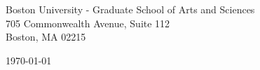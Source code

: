 \begin{minipage}{0.49\textwidth}
\begin{flushleft}
\noindent 
Boston University - Graduate School of Arts and Sciences \\
705 Commonwealth Avenue, Suite 112 \\
Boston, MA 02215 
\end{flushleft}
\end{minipage}
\begin{minipage}{0.47\textwidth}
\begin{flushright}
\today
\end{flushright}
\end{minipage} \\

\newcommand{\univ}{Boston University}
\newcommand{\univshort}{BU}
\newcommand{\degree}{Ph.D.}
\newcommand{\dept}{Bioinformatics}

